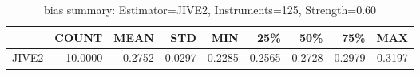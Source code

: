 \begin{table}[ht]
\centering
\caption{bias summary: Estimator=JIVE2, Instruments=125, Strength=0.60}
\begin{tabular}{lrrrrrrrr}
\toprule
 & COUNT & MEAN & STD & MIN & 25\% & 50\% & 75\% & MAX \\
\midrule
JIVE2 & 10.0000 & 0.2752 & 0.0297 & 0.2285 & 0.2565 & 0.2728 & 0.2979 & 0.3197 \\
\bottomrule
\end{tabular}
\end{table}
